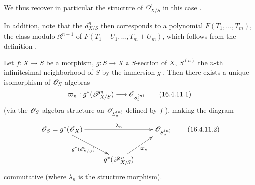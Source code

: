 We thus recover in particular the structure of $\Omega_{X/S}^1$ in this case .

In addition, note that the $d_{X/S}^n$ then corresponds to a polynomial $F(T_1, \dots, T_m)$, the class modulo $\mathfrak{K}^{n+1}$ of $F(T_1 + U_1, \dots, T_m + U_m)$, which follows from the definition .

\begin{proposition}[16.4.11]
\label{IV.16.4.11}  
Let $f:X \to S$ be a morphism, $g: S \to X$ a $S$-section of $X$, $S^{(n)}$ the $n$-th infinitesimal neighborhood of $S$ by the immersion $g$ .
Then there exists a unique isomorphism of $\mathscr{O}_S$-algebras
\[
  \label{IV.16.4.11.1}
  \varpi_n: g^*(\sh{P}_{X/S}^n) \to \sh{O}_{S_g^{(n)}}
  \tag{16.4.11.1}
\]  
(via the $\mathscr{O}_S$-algebra structure on $\mathscr{O}_{S_g^{(n)}}$ defined by $f$ ), making the diagram
\[
  \label{IV.16.4.11.2}
  \xymatrix{
    \sh{O}_S = g^*(\sh{O}_X) \ar[rr]^-{\lambda_n} \ar[dr]_-{g^*(d_{X/S}^n)} && \sh{O}_{S_g^{(n)}} \\
    & g^*(\sh{P}_{X/S}^n) \ar[ur]_-{\varpi_n}
  }
  \tag{16.4.11.2}
\]
commutative (where $\lambda_n$ is the structure morphism).
\end{proposition} 


